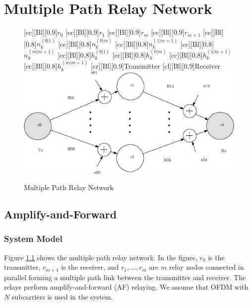 \chapter{Multiple Path Relay Network}
\label{chap:mp}

\begin{figure}
  \centering
    [cc][Bl][0.9]{$r_0$}
    [cc][Bl][0.9]{$r_1$}
    [cc][Bl][0.9]{$r_m$}
    [cc][Bl][0.9]{$r_{m+1}$}
    [cc][Bl][0.8]{$n_k^{(0|1)}$}
    [cc][Bl][0.8]{$n_k^{(0|m)}$}
    [cc][Bl][0.8]{$n_k^{(1|m+1)}$}
    [cc][Bl][0.8]{$n_k^{(m|m+1)}$}
    [cc][Bl][0.8]{$h_k^{(0|1)}$}
    [cc][Bl][0.8]{$h_k^{(0|m)}$}
    [cc][Bl][0.8]{$h_k^{(1|m+1)}$}
    [cc][Bl][0.8]{$h_k^{(m|m+1)}$}
    [cr][Bl][0.9]{Transmitter}
    [cl][Bl][0.9]{Receiver}
    \includegraphics[width=5in]{mp_model.eps}
   \caption{Multiple Path Relay Network \label{fig:mp_sm} }
\end{figure}

\section{Amplify-and-Forward}
\label{sec:mp_af}

\subsection{System Model}
\label{subsec:mp_af_sm}

Figure \ref{fig:mp_sm} shows the multiple path relay network.  In the figure, $r_0$ is the transmitter, $r_{m+1}$ is the receiver, and $r_1, \ldots, r_m$ are $m$ relay nodes connected in parallel forming a multiple path link between the transmitter and receiver.  The relays perform amplify-and-forward (AF) relaying.  We assume that OFDM with $N$ subcarriers is used in the system.

